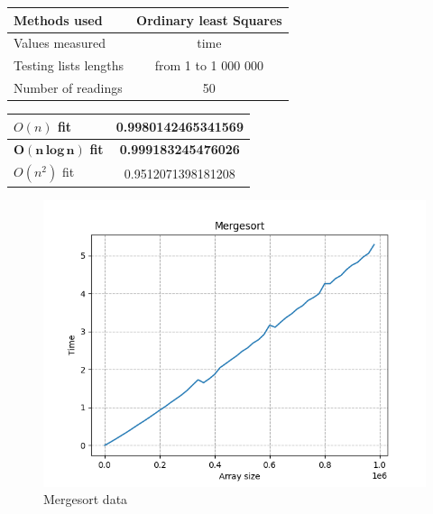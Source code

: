 \documentclass{article}
\begin{document}
            \noindent
            \begin{minipage}{0.45\textwidth}
            \centering
            \begin{tabular}{|l|c|}
                \hline
                Methods used & Ordinary least Squares \\
                \hline
                Values measured & time \\
                \hline
                Testing lists lengths &  from 1 to 1 000 000\\
                \hline
                Number of readings & 50 \\
                \hline
                \end{tabular}
                
            \vspace{1cm}
            \begin{tabular}{|l|c|}
                \hline
                $O(n)$ fit & 0.9980142465341569 \\
                \hline
                $\mathbf{O(n\,log\,n)}$ \textbf{fit} & \textbf{0.999183245476026} \\
                \hline
                $O(n^2)$ fit & 0.9512071398181208 \\
                \hline
                
            \end{tabular}

            \end{minipage}
            \begin{minipage}{0.6\textwidth}
            \begin{figure}[H]
                    \includegraphics[scale=0.58, right]{images/mergesort_grid_1mil_50readingsv2.png}
                    \caption{Mergesort data}
                    \label{fig: merge}
            \end{figure}
            \end{minipage}
\end{document}
